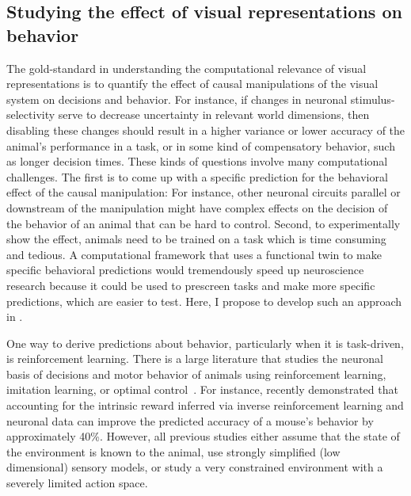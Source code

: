 \documentclass[B2,COG]{ercgrant}
\begin{document}
\subsection{Studying the effect of visual representations on behavior}
The gold-standard in understanding the computational relevance of visual representations  is to quantify the effect of causal manipulations of the visual system on decisions and behavior. 
For instance, if changes in neuronal stimulus-selectivity serve to decrease uncertainty in relevant world dimensions, then disabling these changes should result in a higher variance or lower accuracy of the animal's performance in a task, or in some kind of compensatory behavior, such as longer decision times.
These kinds of questions involve many computational  challenges. 
The first is to come up with a specific prediction for the behavioral effect of the causal manipulation: For instance, other neuronal circuits parallel or downstream of the manipulation might have complex effects on the decision of the behavior of an animal that can be hard to control. 
Second, to experimentally show the effect, animals need to be trained on a task which is time consuming and tedious. 
A computational framework that uses a functional twin to make specific behavioral predictions would tremendously speed up neuroscience research because it could be used to prescreen tasks and make more specific predictions, which are easier to test. 
Here, I propose to develop such an approach in . 

One way to derive predictions about behavior, particularly when it is task-driven, is reinforcement learning.
There is a large literature that studies the neuronal basis of decisions and motor behavior of animals using reinforcement learning, imitation learning, or optimal control~\parencite{Schultz1997-xu,Todorov2004-yb, Morris2006-ub, Botvinick2009-nn, Yamaguchi2018-xp, Miyazaki2018-gy}.
For instance, \textcite{Kalweit2022-ev} recently demonstrated that accounting for the intrinsic reward inferred via inverse reinforcement learning and neuronal data can improve the predicted accuracy of a mouse's behavior by approximately 40\%.
However, all previous studies either assume that the state of the environment is known to the animal, use strongly simplified (low dimensional) sensory models, or study a very constrained environment with a severely limited action space. 
\end{document}
